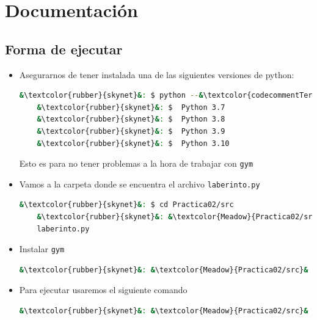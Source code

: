 \documentclass[a4paper,12pt]{article}
\begin{document}


\newpage

\section{Documentación}

\subsection{Forma de ejecutar}
\begin{itemize}
    \item Asegurarnos de tener instalada una de las siguientes versiones de python: \cite{docGym}
\begin{lstlisting}[language=bash]
    &\textcolor{rubber}{skynet}&: $ python --&\textcolor{codecommentTerminal}{version}&
    &\textcolor{rubber}{skynet}&: $  Python 3.7   
    &\textcolor{rubber}{skynet}&: $  Python 3.8
    &\textcolor{rubber}{skynet}&: $  Python 3.9
    &\textcolor{rubber}{skynet}&: $  Python 3.10
\end{lstlisting}
    Esto es para no tener problemas a la hora de trabajar con \texttt{gym}

    \item Vamos a la carpeta donde se encuentra el archivo \texttt{laberinto.py}
\begin{lstlisting}[language=bash]
    &\textcolor{rubber}{skynet}&: $ cd Practica02/src
    &\textcolor{rubber}{skynet}&: &\textcolor{Meadow}{Practica02/src}& $  ls         
    laberinto.py
\end{lstlisting}

    \item Instalar \texttt{gym}
\begin{lstlisting}[language=bash]    
    &\textcolor{rubber}{skynet}&: &\textcolor{Meadow}{Practica02/src}& $  pip install gym
\end{lstlisting}    

    \item Para ejecutar usaremos el siguiente comando
\begin{lstlisting}[language=bash]    
    &\textcolor{rubber}{skynet}&: &\textcolor{Meadow}{Practica02/src}& $  python laberinto.py    
\end{lstlisting}
\end{itemize}
\end{document}
